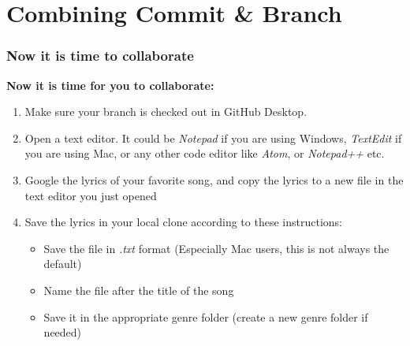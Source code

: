 \documentclass[aspectratio=169]{beamer} %
\begin{document}
\section{Combining Commit \& Branch}

\begin{frame}
\frametitle{Now it is time to collaborate}

\textbf{Now it is time for you to collaborate:}
\begin{enumerate}
	\item Make sure your branch is checked out in GitHub Desktop.
	\item Open a text editor. It could be \textit{Notepad} if you are using Windows, \textit{TextEdit} if you are using Mac, or any other code editor like \textit{Atom}, or \textit{Notepad++} etc.
	\item Google the lyrics of your favorite song, and copy the lyrics to a new file in the text editor you just opened
	\item Save the lyrics in your local clone according to these instructions:
	\begin{itemize}
		\item Save the file in \textit{.txt} format (Especially Mac users, this is not always the default)
		\item Name the file after the title of the song
		\item Save it in the appropriate genre folder (create a new genre folder if needed)
	\end{itemize}
\end{enumerate}

\end{frame}
\end{document}
